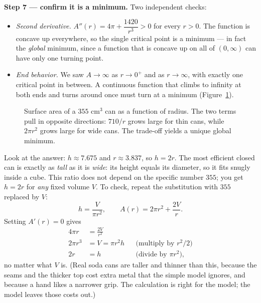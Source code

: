 \textbf{Step 7 --- confirm it is a minimum.} Two independent checks:
\begin{itemize}
  \item \emph{Second derivative.} $A''(r) = 4\pi + \dfrac{1420}{r^3} > 0$ for every
    $r>0$. The function is concave up everywhere, so the single critical point is a
    minimum --- in fact the \emph{global} minimum, since a function that is concave up
    on all of $(0,\infty)$ can have only one turning point.
  \item \emph{End behavior.} We saw $A\to\infty$ as $r\to0^+$ and as $r\to\infty$,
    with exactly one critical point in between. A continuous function that climbs to
    infinity at both ends and turns around once must turn at a minimum
(Figure~\ref{ch17:fig-can}).
\end{itemize}

\begin{figure}[H]
\centering
{}
\caption{Surface area of a $355$ cm$^3$ can as a function of radius. The two terms
pull in opposite directions: $710/r$ grows large for thin cans, while $2\pi r^2$ grows large for
wide cans. The trade-off yields a unique global minimum.}
\label{ch17:fig-can}
\end{figure}

\begin{aestheticbox}
Look at the answer: $h \approx 7.675$ and $r \approx 3.837$, so
$h = 2r$. The most efficient closed can is exactly as \emph{tall} as it is
\emph{wide}: its height equals its diameter, so it fits snugly inside a cube. This
ratio does not depend on the specific number $355$; you get $h=2r$ for \emph{any}
fixed volume $V$. To check, repeat the substitution with $355$ replaced by $V$:
\[
h=\frac{V}{\pi r^2}, \qquad A(r)=2\pi r^2 + \frac{2V}{r}.
\]
Setting $A'(r)=0$ gives
\begin{align*}
4\pi r &= \frac{2V}{r^2}\\
2\pi r^3 &= V = \pi r^2 h &&\text{(multiply by $r^2/2$)}\\
2r &= h &&\text{(divide by $\pi r^2$)},
\end{align*}
no matter what $V$ is. (Real soda cans are taller and thinner than this, because the seams and the
thicker top cost extra metal that the simple model ignores, and because a hand likes
a narrower grip. The calculation is right for the model; the model leaves those
costs out.)
\end{aestheticbox}

